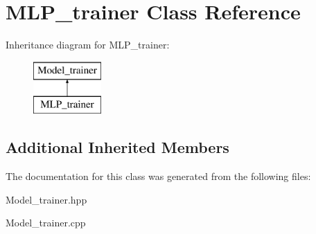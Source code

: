 \hypertarget{class_m_l_p__trainer}{\section{M\+L\+P\+\_\+trainer Class Reference}
\label{class_m_l_p__trainer}
}
Inheritance diagram for M\+L\+P\+\_\+trainer\+:\begin{figure}[H]
\begin{center}
\leavevmode
\includegraphics[height=2.000000cm]{class_m_l_p__trainer}
\end{center}
\end{figure}
\subsection*{Additional Inherited Members}


The documentation for this class was generated from the following files\+:\begin{DoxyCompactItemize}
\item 
Model\+\_\+trainer.\+hpp\item 
Model\+\_\+trainer.\+cpp\end{DoxyCompactItemize}
